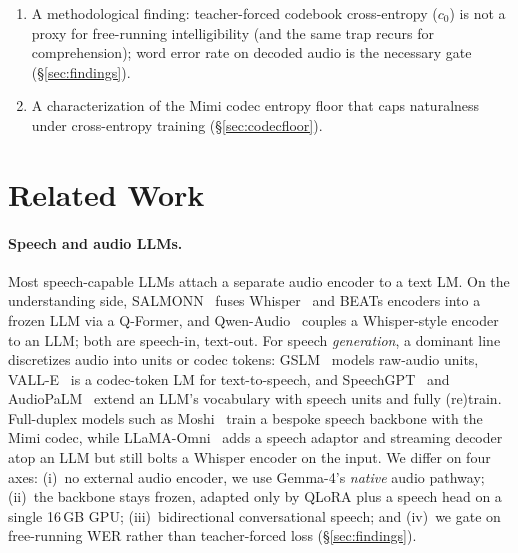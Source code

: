 \documentclass[11pt]{article}
\begin{document}
\begin{enumerate}
        content-selection pass then voices the reply with the adapter on recovers
        correct content with largely intelligible speech, with no retraining
        (\S\ref{sec:unified}).
  \item A methodological finding: teacher-forced codebook cross-entropy ($c_0$)
        is not a proxy for free-running intelligibility (and the same trap recurs
        for comprehension); word error rate on decoded audio is the necessary gate
        (\S\ref{sec:findings}).
  \item A characterization of the Mimi codec entropy floor that caps naturalness
        under cross-entropy training (\S\ref{sec:codecfloor}).
\end{enumerate}

\section{Related Work}
\label{sec:related}
\paragraph{Speech and audio LLMs.}
Most speech-capable LLMs attach a separate audio encoder to a text LM. On the
understanding side, SALMONN~\citep{tang2024salmonn} fuses Whisper~\citep{radford2023whisper}
and BEATs encoders into a frozen LLM via a Q-Former, and Qwen-Audio~\citep{chu2023qwenaudio}
couples a Whisper-style encoder to an LLM; both are speech-in, text-out. For
speech \emph{generation}, a dominant line discretizes audio into units or codec
tokens: GSLM~\citep{lakhotia2021gslm} models raw-audio units, VALL-E~\citep{wang2023valle}
is a codec-token LM for text-to-speech, and SpeechGPT~\citep{zhang2023speechgpt}
and AudioPaLM~\citep{rubenstein2023audiopalm} extend an LLM's vocabulary with
speech units and fully (re)train. Full-duplex models such as
Moshi~\citep{defossez2024moshi} train a bespoke speech backbone with the Mimi
codec, while LLaMA-Omni~\citep{fang2024llamaomni} adds a speech adaptor and
streaming decoder atop an LLM but still bolts a Whisper encoder on the input. We
differ on four axes: (i)~no external audio encoder, we use Gemma-4's
\emph{native} audio pathway; (ii)~the backbone stays frozen, adapted only by
QLoRA plus a speech head on a single 16\,GB GPU; (iii)~bidirectional
conversational speech; and (iv)~we gate on free-running WER rather than
teacher-forced loss (\S\ref{sec:findings}).
\end{document}
